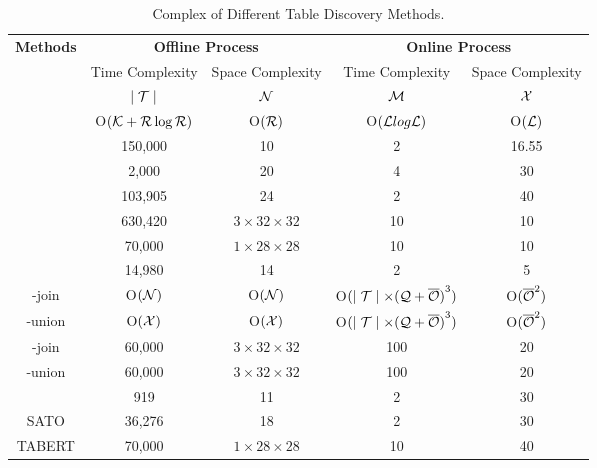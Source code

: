     \begin{table*}[t]
	\centering
	\caption{Complex of Different Table Discovery Methods.}  \vspace{-1em}
	{
		\begin{tabular}{c||cc|cc}
			\toprule
			\multirow{2}{1cm}{\textbf{Methods}} & \multicolumn{2}{c}{\textbf{Offline Process}} & \multicolumn{2}{c}{\textbf{Online Process}} \\ 
			&Time Complexity    & Space Complexity & Time Complexity & Space Complexity \\ 
			\midrule[1pt]     %
			
			\starmie         & $\mid \mathcal{T} \mid$         & $\mathcal{N}$                   & $\mathcal{M}$               & $\mathcal{X}$      \\
			\josie             & O$(\mathcal{K} + \mathcal{R} \log \mathcal{R})$         & O$(\mathcal{R})$                   & O$(\mathcal{L} log \mathcal{L})$         & O$(\mathcal{L})$        \\         
			\lsh          & 150,000        & 10                   & 2                & 16.55     \\
			\dlll          & 2,000          & 20                   & 4                & 30       \\
			\pex          & 103,905        & 24                   & 2                & 40      \\
			\deepjoin             & 630,420        & $3\times32\times32$    & 10               & 10      \\
			\tus          & 70,000         & $1\times28\times28$    & 10               & 10          \\
			\santos              & 14,980         & 14                   & 2                & 5     \\
			\frt-join         &  O$(\mathcal{N})$        & O$(\mathcal{N})$    & O$( \mid \mathcal{T} \mid \times {(\mathcal{Q}+ \overline{\mathcal{O}})}^3)$               & O$({\overline{\mathcal{O}}}^2)$       \\
			\frt-union         & O$(\mathcal{X})$         & O$(\mathcal{X})$    & O$(\mid \mathcal{T} \mid \times {(\mathcal{Q}+ \overline{\mathcal{O}})}^3)$               & O$({\overline{\mathcal{O}}}^2)$       \\
			\infogather-join        & 60,000         & $3\times32\times32$    & 100              & 20      \\
			\infogather-union        & 60,000         & $3\times32\times32$    & 100              & 20      \\
			\aurum            & 919            & 11                   & 2                & 30       \\
			SATO            & 36,276         & 18                   & 2                & 30    \\
			TABERT         & 70,000         & $1\times28\times28$    & 10               & 40       \\
		
			\bottomrule
		\end{tabular}
	}
	\vspace{-1em}
	\label{table:complex_analyse}
	\end{table*}

